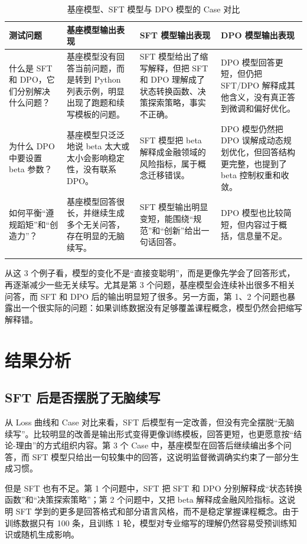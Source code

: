 \documentclass[a4paper,12pt]{ctexart}
\begin{document}
{\small
\begin{longtable}{L{0.20\textwidth}L{0.22\textwidth}L{0.22\textwidth}L{0.22\textwidth}}
    \toprule
    测试问题 & 基座模型输出表现 & SFT 模型输出表现 & DPO 模型输出表现 \\
    \midrule
    什么是 SFT 和 DPO，它们分别解决什么问题？
    & 基座模型没有回答当前问题，而是转到 Python 列表示例，明显出现了跑题和续写模板的问题。
    & SFT 模型给出了缩写解释，但把 SFT 和 DPO 理解成了状态转换函数、决策探索策略，事实不正确。
    & DPO 模型回答更短，但仍把 SFT/DPO 解释成其他含义，没有真正答到微调和偏好优化。 \\
    \midrule
    为什么 DPO 中要设置 beta 参数？
    & 基座模型只泛泛地说 beta 太大或太小会影响稳定性，没有联系 DPO。
    & SFT 模型把 beta 解释成金融领域的风险指标，属于概念迁移错误。
    & DPO 模型仍然把 DPO 误解成动态规划优化，但回答结构更完整，也提到了 beta 控制权重和收敛。 \\
    \midrule
    如何平衡“遵规蹈矩”和“创造力”？
    & 基座模型回答很长，并继续生成多个无关问答，存在明显的无脑续写。
    & SFT 模型输出明显变短，能围绕“规范”和“创新”给出一句话回答。
    & DPO 模型也比较简短，但内容过于概括，信息量不足。 \\
    \bottomrule
    \caption{基座模型、SFT 模型与 DPO 模型的 Case 对比}
\end{longtable}
}

从这 3 个例子看，模型的变化不是“直接变聪明”，而是更像先学会了回答形式，再逐渐减少一些无关续写。尤其是第 3 个问题，基座模型会连续补出很多不相关问答，而 SFT 和 DPO 后的输出明显短了很多。另一方面，第 1、2 个问题也暴露出一个很实际的问题：如果训练数据没有足够覆盖课程概念，模型仍然会把缩写解释错。

\section{结果分析}

\subsection{SFT 后是否摆脱了无脑续写}

从 Loss 曲线和 Case 对比来看，SFT 后模型有一定改善，但没有完全摆脱“无脑续写”。比较明显的改善是输出形式变得更像训练模板，回答更短，也更愿意按“结论-理由”的方式组织内容。第 3 个 Case 中，基座模型在回答后继续编出多个问答，而 SFT 模型只给出一句较集中的回答，这说明监督微调确实约束了一部分生成习惯。

但是 SFT 也有不足。第 1 个问题中，SFT 把 SFT 和 DPO 分别解释成“状态转换函数”和“决策探索策略”；第 2 个问题中，又把 beta 解释成金融风险指标。这说明 SFT 学到的更多是回答格式和部分语言风格，而不是稳定掌握课程概念。由于训练数据只有 100 条，且训练 1 轮，模型对专业缩写的理解仍然容易受预训练知识或随机生成影响。
\end{document}
